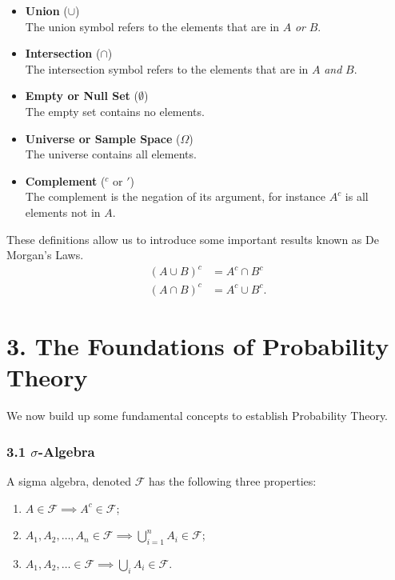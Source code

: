 \documentclass[11pt]{article}
\begin{document}
\begin{itemize}
    \item \textbf{Union} ($\cup$) \\
    The union symbol refers to the elements that are in $A$ \textit{or} $B$.
    \item \textbf{Intersection} ($\cap$) \\
    The intersection symbol refers to the elements that are in $A$ \textit{and} $B$.
    \item \textbf{Empty or Null Set} ($\emptyset$) \\
    The empty set contains no elements.
    \item \textbf{Universe or Sample Space} ($\Omega$) \\
    The universe contains all elements.
    \item \textbf{Complement} ($^c$ or $'$) \\
    The complement is the negation of its argument, for instance $A^c$ is all elements not in $A$.
\end{itemize}

These definitions allow us to introduce some important results known as De Morgan's Laws.
\begin{align}
    (A \cup B)^c &= A^c \cap B^c \\
    (A \cap B)^c &= A^c \cup B^c.
\end{align}
    
\section*{3. The Foundations of Probability Theory}
We now build up some fundamental concepts to establish Probability Theory.

\subsubsection*{3.1 $\sigma$-Algebra}
A sigma algebra, denoted $\mathcal{F}$ has the following three properties:
\begin{enumerate}
    \item $A \in \mathcal{F} \implies A^c \in \mathcal{F}$;
    \item $A_1, A_2, \ldots , A_n \in \mathcal{F} \implies \bigcup_{i=1}^{n} A_i \in \mathcal{F}$;
    \item $A_1, A_2, \ldots \in \mathcal{F} \implies \bigcup_i A_i \in \mathcal{F}$. 
\end{enumerate}
\end{document}
